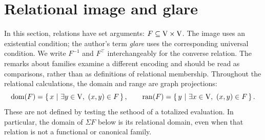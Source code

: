 \def\topic{}

\section{Relational image and glare}
In this section, relations have set arguments: $F\subseteq\mathrm{V}\times\mathrm{V}$.
The image uses an existential condition; the author's term \emph{glare}
uses the corresponding universal condition. We write $F^{-1}$ and
$F^\top$ interchangeably for the converse relation.
The remarks about families examine a different encoding and should be
read as comparisons, rather than as definitions of relational membership.
Throughout the relational calculations, the domain and range are graph
projections:
\[
\mathrm{dom}(F)=\left\{\,x\ \middle|\ \exists y\in\mathrm{V},\ (x,y)\in F\,\right\},\qquad
\mathrm{ran}(F)=\left\{\,y\ \middle|\ \exists x\in\mathrm{V},\ (x,y)\in F\,\right\}.
\]
These are not defined by testing the sethood of a totalized evaluation.
In particular, the domain of $\Sigma F$ below is its relational domain,
even when that relation is not a functional or canonical family.

